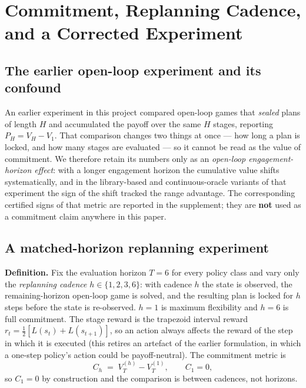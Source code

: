 \documentclass[12pt,a4paper]{article}
\begin{document}
\section{Commitment, Replanning Cadence, and a Corrected Experiment}\label{sec:commitment}

\subsection{The earlier open-loop experiment and its confound}

An earlier experiment in this project compared open-loop games that
\emph{sealed} plans of length $H$ and accumulated the payoff over the same
$H$ stages, reporting $P_H=V_H-V_1$.  That comparison changes two things at
once --- how long a plan is locked, and how many stages are evaluated --- so
it cannot be read as the value of commitment.  We therefore retain its
numbers only as an \emph{open-loop engagement-horizon effect}: with a longer
engagement horizon the cumulative value shifts systematically, and in the
library-based and continuous-oracle variants of that experiment the sign of
the shift tracked the range advantage.  The corresponding certified signs of
that metric are reported in the supplement; they are \textbf{not} used as a
commitment claim anywhere in this paper.

\subsection{A matched-horizon replanning experiment}

\noindent\textbf{Definition.}  Fix the evaluation horizon $T=6$ for every
policy class and vary only the \emph{replanning cadence} $h\in\{1,2,3,6\}$:
with cadence $h$ the state is observed, the remaining-horizon open-loop game
is solved, and the resulting plan is locked for $h$ steps before the state is
re-observed.  $h=1$ is maximum flexibility and $h=6$ is full commitment.  The
stage reward is the trapezoid interval reward
$r_t=\tfrac12[L(s_t)+L(s_{t+1})]$, so an action always affects the reward of
the step in which it is executed (this retires an artefact of the earlier
formulation, in which a one-step policy's action could be payoff-neutral).
The commitment metric is
\begin{equation}
C_h \;=\; V_T^{(h)} - V_T^{(1)}, \qquad C_1 = 0 ,
\label{eq:C}
\end{equation}
so $C_1=0$ by construction and the comparison is between cadences, not
horizons.
\end{document}
